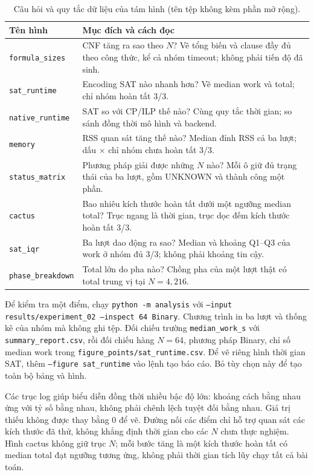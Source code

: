\begin{table}[pos=H]\centering\small
\caption{Câu hỏi và quy tắc dữ liệu của tám hình (tên tệp không kèm phần mở rộng).}
\begin{tabular}{@{}p{.25\linewidth}p{.68\linewidth}@{}}\toprule
Tên hình & Mục đích và cách đọc\\\midrule
\texttt{formula\_sizes} & CNF tăng ra sao theo $N$? Vẽ tổng biến và clause đầy đủ theo công thức, kể cả nhóm timeout; không phải tiến độ đã sinh.\\
\texttt{sat\_runtime} & Encoding SAT nào nhanh hơn? Vẽ median work và total; chỉ nhóm hoàn tất 3/3.\\
\texttt{native\_runtime} & SAT so với CP/ILP thế nào? Cùng quy tắc thời gian; so sánh đồng thời mô hình và backend.\\
\texttt{memory} & RSS quan sát tăng thế nào? Median đỉnh RSS cả ba lượt; dấu $\times$ chỉ nhóm chưa hoàn tất 3/3.\\
\texttt{status\_matrix} & Phương pháp giải được những $N$ nào? Mỗi ô giữ đủ trạng thái của ba lượt, gồm UNKNOWN và thành công một phần.\\
\texttt{cactus} & Bao nhiêu kích thước hoàn tất dưới một ngưỡng median total? Trục ngang là thời gian, trục dọc đếm kích thước hoàn tất 3/3.\\
\texttt{sat\_iqr} & Ba lượt dao động ra sao? Median và khoảng Q1--Q3 của work ở nhóm đủ 3/3; không phải khoảng tin cậy.\\
\texttt{phase\_breakdown} & Total lớn do pha nào? Chồng pha của một lượt thật có total trung vị tại $N=4,216$.\\
\bottomrule\end{tabular}
\end{table}

Để kiểm tra một điểm, chạy \texttt{python -m analysis} với \texttt{--input results/experiment\_02 --inspect 64 Binary}. Chương trình in ba lượt và thống kê của nhóm mà không ghi tệp. Đối chiếu trường \texttt{median\_work\_s} với \texttt{summary\_report.csv}, rồi đối chiếu hàng $N=64$, phương pháp Binary, chỉ số median work trong \texttt{figure\_points/sat\_runtime.csv}. Để vẽ riêng hình thời gian SAT, thêm \texttt{--figure sat\_runtime} vào lệnh tạo báo cáo. Bỏ tùy chọn này để tạo toàn bộ bảng và hình.

Các trục log giúp biểu diễn đồng thời nhiều bậc độ lớn: khoảng cách bằng nhau ứng với tỷ số bằng nhau, không phải chênh lệch tuyệt đối bằng nhau. Giá trị thiếu không được thay bằng 0 để vẽ. Đường nối các điểm chỉ hỗ trợ quan sát các kích thước đã thử, không khẳng định thời gian cho các $N$ chưa thực nghiệm. Hình cactus không giữ trục $N$; mỗi bước tăng là một kích thước hoàn tất có median total đạt ngưỡng tương ứng, không phải thời gian tích lũy chạy tất cả bài toán.

